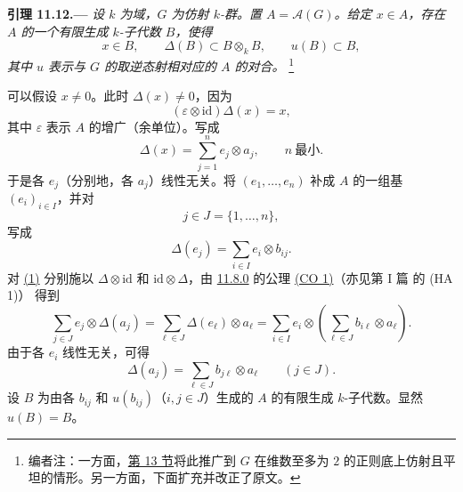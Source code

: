 

\medskip
{}\label{lem:sga3-VIB-11.12}%
\noindent\textbf{引理 11.12.---}
\emph{设 \(k\) 为域，\(G\) 为仿射 \(k\)-群。置 \(A=\mathcal A(G)\)。给定 \(x\in A\)，存在 \(A\) 的一个有限生成 \(k\)-子代数 \(B\)，使得}
\[
  x\in B,\qquad
  \Delta(B)\subset B\otimes_kB,\qquad
  u(B)\subset B,
\]
\emph{其中 \(u\) 表示与 \(G\) 的取逆态射相对应的 \(A\) 的对合。}%
\footnote{\label{note:sga3-VIB-125}编者注：一方面，\hyperref[sec:sga3-VIB-13]{第 13 节}将此推广到 \(G\) 在维数至多为 \(2\) 的正则底上仿射且平坦的情形。另一方面，下面扩充并改正了原文。}

可以假设 \(x\neq0\)。此时 \(\Delta(x)\neq0\)，因为
\[
  (\varepsilon\otimes\mathrm{id})\Delta(x)=x,
\]
其中 \(\varepsilon\) 表示 \(A\) 的增广\textup{（余单位）}。写成
\label{form:sga3-VIB-11.12-eq1}%
\[
  \tag{1}
  \Delta(x)=\sum_{j=1}^{n}e_j\otimes a_j,
  \qquad n\ \text{最小}.
\]
于是各 \(e_j\)\textup{（分别地，各 \(a_j\)）}线性无关。将 \((e_1,\ldots,e_n)\) 补成 \(A\) 的一组基 \((e_i)_{i\in I}\)，并对
\[
  j\in J=\{1,\ldots,n\},
\]
写成
\[
  \Delta(e_j)=\sum_{i\in I}e_i\otimes b_{ij}.
\]
对 \hyperref[form:sga3-VIB-11.12-eq1]{\textup{(1)}} 分别施以 \(\Delta\otimes\mathrm{id}\) 和 \(\mathrm{id}\otimes\Delta\)，由 \hyperref[def:sga3-VIB-11.8.0]{11.8.0} 的公理 \hyperref[ax:sga3-VIB-11.8.0-CO1]{\textup{(CO 1)}}\textup{（亦见第 I 篇  的 \textup{(HA 1)}）} 得到
\[
  \sum_{j\in J}e_j\otimes\Delta(a_j)
  =
  \sum_{\ell\in J}\Delta(e_\ell)\otimes a_\ell
  =
  \sum_{i\in I}e_i\otimes
    \left(\sum_{\ell\in J}b_{i\ell}\otimes a_\ell\right).
\]
由于各 \(e_i\) 线性无关，可得
\label{form:sga3-VIB-11.12-eq2}%
\[
  \tag{2}
  \Delta(a_j)=\sum_{\ell\in J}b_{j\ell}\otimes a_\ell
  \qquad (j\in J).
\]
设 \(B\) 为由各 \(b_{ij}\) 和 \(u(b_{ij})\)（\(i,j\in J\)）生成的 \(A\) 的有限生成 \(k\)-子代数。显然 \(u(B)=B\)。

